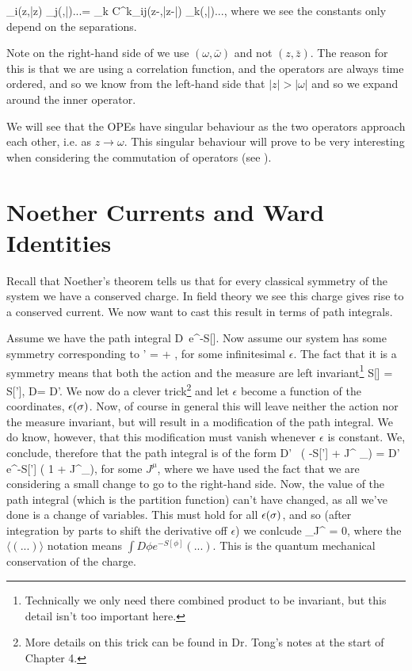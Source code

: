\be 
\label{eqn:OPE}
    \langle\cO_i(z,\bar{z}) \cO_j(\omega,\bar{\omega})...\rangle = \sum_{k} C^k_{ij}(z-\omega,\bar{z}-\bar{\omega}) \langle\cO_k(\omega,\bar{\omega})...\rangle,
\ee 
where we see the constants only depend on the separations. 

\br 
    Note on the right-hand side of  we use $(\omega,\bar{\omega})$ and not $(z,\bar{z})$. The reason for this is that we are using a correlation function, and the operators are always time ordered, and so we know from the left-hand side that $|z|>|\omega|$ and so we expand around the inner operator.
\er 

\br 
\label{rem:OPESingular}
    We will see that the OPEs have singular behaviour as the two operators approach each other, i.e. as $z\to\omega$. This singular behaviour will prove to be very interesting when considering the commutation of operators (see ).
\er 

\section{Noether Currents and Ward Identities}

Recall that Noether's theorem tells us that for every classical symmetry of the system we have a conserved charge. In field theory we see this charge gives rise to a conserved current. We now want to cast this result in terms of path integrals. 

Assume we have the path integral
\bse 
    \int D\phi \, e^{-S[\phi]}.
\ese 
Now assume our system has some symmetry corresponding to 
\bse 
    \phi \to \phi' = \phi + \epsilon \del \phi,
\ese 
for some infinitesimal $\epsilon$. The fact that it is a symmetry means that both the action and the measure are left invariant\footnote{Technically we only need there combined product to be invariant, but this detail isn't too important here.}
\bse 
    S[\phi] = S[\phi'], \qquad {} \qquad D\phi = D\phi'.
\ese 
We now do a clever trick\footnote{More details on this trick can be found in Dr. Tong's notes at the start of Chapter 4.} and let $\epsilon$ become a function of the coordinates, $\epsilon(\sigma)$. Now, of course in general this will leave neither the action nor the measure invariant, but will result in a modification of the path integral. We do know, however, that this modification must vanish whenever $\epsilon$ is constant. We, conclude, therefore that the path integral is of the form 
\bse 
    \int D\phi' \, \exp \bigg( -S[\phi'] + \int J^{\mu} \p_{\mu}\epsilon \bigg) = \int D\phi' \, e^{-S[\phi']} \bigg( 1 + \int J^{\mu}\p_{\mu}\epsilon\bigg),
\ese 
for some $J^{\mu}$, where we have used the fact that we are considering a small change to go to the right-hand side. Now, the value of the path integral (which is the partition function) can't have changed, as all we've done is a change of variables. This must hold for all $\epsilon(\sigma)$, and so (after integration by parts to shift the derivative off $\epsilon$) we conlcude 
\be 
\label{eqn:NoetherQM}
    \langle \p_{\mu}J^{\mu} \rangle = 0,
\ee 
where the $\langle (...)\rangle$ notation means $\int D\phi e^{-S[\phi]}(...)$. This is the quantum mechanical conservation of the charge. 

